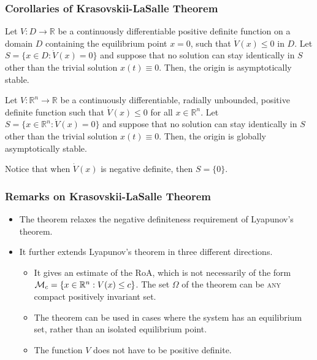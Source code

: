 \begin{frame}
    \frametitle{Corollaries of Krasovskii-LaSalle Theorem}

    \begin{corollary}
        Let $V: D \rightarrow \mathbb{R}$ be a continuously differentiable
        positive definite function on a domain $D$ containing the equilibrium
        point $x=0$, such that $\dot{V}(x) \leq 0$ in $D$. Let $S = \{x \in D:
        \dot{V}(x) = 0\}$ and suppose that no solution can stay identically in
        $S$ other than the trivial solution $x(t) \equiv 0$. Then, the origin is
        asymptotically stable.
    \end{corollary}

    \begin{corollary}
        Let $V: \mathbb{R}^n \rightarrow \mathbb{R}$ be a continuously
        differentiable, radially unbounded, positive definite function such that
        $\dot{V}(x) \leq 0$ for all $x \in \mathbb{R}^n$. Let $S = \{x \in
        \mathbb{R}^n: \dot{V}(x) = 0\}$ and suppose that no solution can stay
        identically in $S$ other than the trivial solution $x(t) \equiv 0$.
        Then, the origin is globally asymptotically stable.
    \end{corollary}

    Notice that when $\dot{V}(x)$ is negative definite, then $S = \{0\}$.
\end{frame}


\begin{frame}
    \frametitle{Remarks on Krasovskii-LaSalle Theorem}

    \begin{itemize}
        \item The theorem relaxes the negative definiteness requirement of
        Lyapunov's theorem.
        \item It further extends Lyapunov's theorem in three different
        directions.
        \begin{itemize}
            \item It gives an estimate of the RoA, which is not necessarily of
            the form $\mathcal{M}_c = \{ x \in \mathbb{R}^n: V(x) \leq c\}$. The set
            $\Omega$ of the theorem can be \textsc{any} compact positively
            invariant set.
            \item The theorem can be used in cases where the system has an
            equilibrium set, rather than an isolated equilibrium point.
            \item The function $V$ does not have to be positive definite.
        \end{itemize}
    \end{itemize}
\end{frame}


